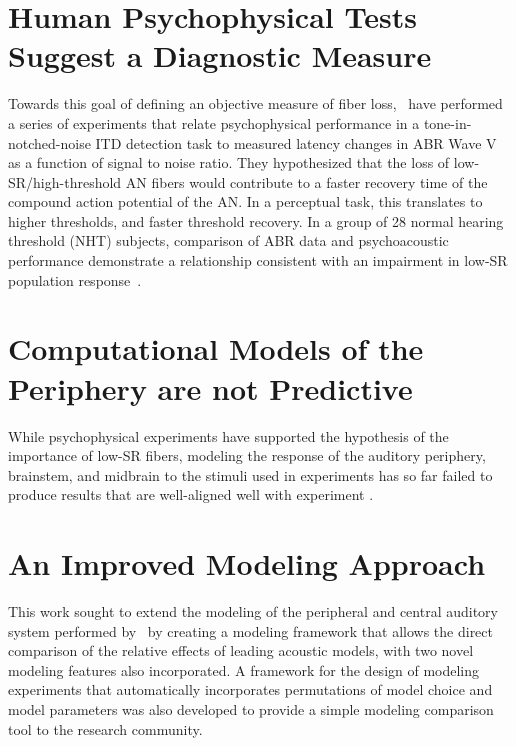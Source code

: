 \section{Human Psychophysical Tests Suggest a Diagnostic Measure}
Towards this goal of defining an objective measure of fiber loss,~\cite{Mehraei2015Individual,Mehraei2016Auditory} have performed a series of experiments that relate psychophysical performance in a tone-in-notched-noise ITD detection task to measured latency changes in ABR Wave V as a function of signal to noise ratio.  They hypothesized that the loss of low-SR/high-threshold AN fibers would contribute to a faster recovery time of the compound action potential of the AN.  In a perceptual task, this translates to higher thresholds, and faster threshold recovery. In a group of 28 normal hearing threshold (NHT) subjects, comparison of ABR data and psychoacoustic performance demonstrate a relationship consistent with an impairment in low-SR population response~\cite{Mehraei2016Auditory}.

\section{Computational Models of the Periphery are not Predictive}

While psychophysical experiments have supported the hypothesis of the importance of low-SR fibers, modeling the response of the auditory periphery, brainstem, and midbrain to the stimuli used in experiments has so far failed to produce results that are well-aligned well with experiment \citep{Mehraei2016Auditory}.

\section{An Improved Modeling Approach} %
\label{sec:an_improved_modeling_approach}
This work sought to extend the modeling of the peripheral and central auditory system performed by~\cite{Mehraei2015Auditory} by creating a modeling framework that allows the direct comparison of the relative effects of leading acoustic models, with two novel modeling features also incorporated.  A framework for the design of modeling experiments that automatically incorporates permutations of model choice and model parameters was also developed to provide a simple modeling comparison tool to the research community. 


